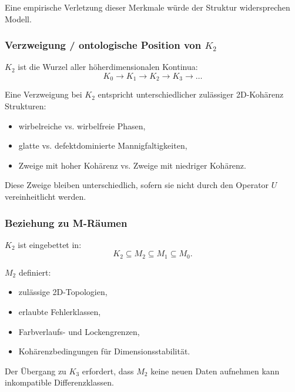 Eine empirische Verletzung dieser Merkmale würde der Struktur widersprechen
Modell.

\subsubsection{Verzweigung / ontologische Position von \texorpdfstring{$K_2$}{K_2}}

$K_2$ ist die Wurzel aller höherdimensionalen Kontinua:
\[
K_0 \to K_1 \to K_2 \to K_3 \to \dots
\]

Eine Verzweigung bei $K_2$ entspricht unterschiedlicher zulässiger 2D-Kohärenz
Strukturen:
\begin{itemize}
    \item wirbelreiche vs. wirbelfreie Phasen,
    \item glatte vs. defektdominierte Mannigfaltigkeiten,
    \item Zweige mit hoher Kohärenz vs. Zweige mit niedriger Kohärenz.
\end{itemize}

Diese Zweige bleiben unterschiedlich, sofern sie nicht durch den Operator $U$ vereinheitlicht werden.

\subsubsection{Beziehung zu M-Räumen}

$K_2$ ist eingebettet in:
\[
K_2 \subseteq M_2 \subseteq M_1 \subseteq M_0.
\]

$M_2$ definiert:
\begin{itemize}
    \item zulässige 2D-Topologien,
    \item erlaubte Fehlerklassen,
    \item Farbverlaufs- und Lockengrenzen,
    \item Kohärenzbedingungen für Dimensionsstabilität.
\end{itemize}

Der Übergang zu $K_3$ erfordert, dass $M_2$ keine neuen Daten aufnehmen kann
inkompatible Differenzklassen.
